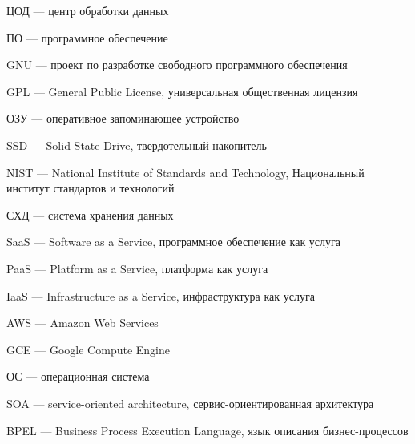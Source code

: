 
ЦОД --- центр обработки данных

ПО --- программное обеспечение

GNU --- проект по разработке свободного программного обеспечения

GPL --- General Public License, универсальная общественная лицензия

ОЗУ --- оперативное запоминающее устройство

SSD --- Solid State Drive, твердотельный накопитель

NIST --- National Institute of Standards and Technology, Национальный институт стандартов и технологий

СХД --- система хранения данных

SaaS --- Software as a Service, программное обеспечение как услуга

PaaS --- Platform as a Service, платформа как услуга

IaaS --- Infrastructure as a Service, инфраструктура как услуга

AWS --- Amazon Web Services

GCE --- Google Compute Engine

ОС --- операционная система

SOA --- service-oriented architecture, сервис-ориентированная архитектура

BPEL --- Business Process Execution Language, язык описания бизнес-процессов

\clearpage
